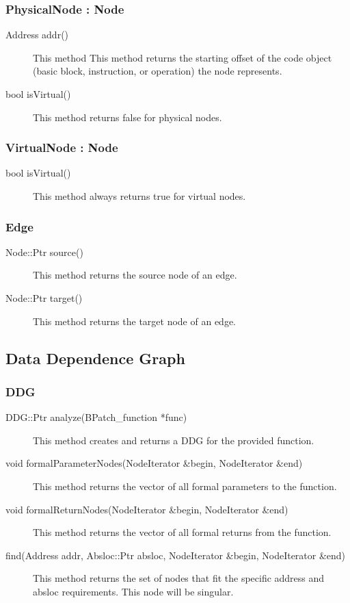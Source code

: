 \documentclass[12pt,titlepage]{article}
\begin{document}
\subsubsection{PhysicalNode : Node}
\begin{description}
\item[Address addr()] This method This method returns the starting
offset of the code object (basic block, instruction, or operation) the
node represents.
\item[bool isVirtual()] This method returns false for physical nodes.
\end{description}

\subsubsection{VirtualNode : Node}
\begin{description}
\item[bool isVirtual()]
This method always returns true for virtual nodes.
\end{description}

\subsubsection{Edge}
\begin{description}
\item[Node::Ptr source()]
This method returns the source node of an edge.
\item[Node::Ptr target() ]
This method returns the target node of an edge.
\end{description}

\subsection{Data Dependence Graph}
\subsubsection{DDG}
\begin{description}
\item[DDG::Ptr analyze(BPatch\_function *func)]
This method creates and returns a DDG for the provided function.
\item[void formalParameterNodes(NodeIterator \&begin, NodeIterator \&end) ]
This method returns the vector of all formal parameters to the function.
\item[void formalReturnNodes(NodeIterator \&begin, NodeIterator \&end)]
This method returns the vector of all formal returns from the function.
\item[find(Address addr, Absloc::Ptr absloc, NodeIterator \&begin, NodeIterator \&end) ]
This method returns the set of nodes that fit the specific address and absloc requirements. This node will be singular. 
\end{description}
\end{document}

